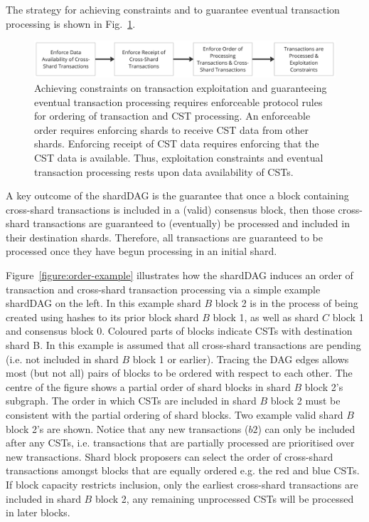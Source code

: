The strategy for achieving constraints and to guarantee eventual transaction processing is shown in Fig.~\ref{figure:shardDAGStrategy}. 
\begin{figure}[h!]
	\centering
	\includegraphics[width=1.0\textwidth]{figures/shardDAGStrategy.jpg}
	\caption{Achieving constraints on transaction exploitation and guaranteeing eventual transaction processing requires enforceable protocol rules for ordering of transaction and CST processing.
		An enforceable order requires enforcing shards to receive CST data from other shards. 
		Enforcing receipt of CST data requires enforcing that the CST data is available. 
		Thus, exploitation constraints and eventual transaction processing rests upon data availability of CSTs.}
	\label{figure:shardDAGStrategy}
\end{figure}

A key outcome of the shardDAG is the guarantee that once a block containing cross-shard transactions is included in a (valid) consensus block, then those cross-shard transactions are guaranteed to (eventually) be processed and included in their destination shards. 
Therefore, all transactions are guaranteed to be processed once they have begun processing in an initial shard.

Figure~\ref{figure:order-example} illustrates how the shardDAG induces an order of transaction and cross-shard transaction processing via a simple example shardDAG on the left. 
In this example shard $B$ block 2 is in the process of being created using hashes to its prior block shard $B$ block 1, as well as shard $C$ block 1 and consensus block 0. 
Coloured parts of blocks indicate CSTs with destination shard B.
In this example is assumed that all cross-shard transactions are pending (i.e. not included in shard $B$ block 1 or earlier). 
Tracing the DAG edges allows most (but not all) pairs of blocks to be ordered with respect to each other.
The centre of the figure shows a partial order of shard blocks in shard $B$ block 2’s subgraph.
The order in which CSTs are included in shard $B$ block 2 must be consistent with the partial ordering of shard blocks. 
Two example valid shard $B$ block 2's are shown.
Notice that any new transactions ($b2$) can only be included after any CSTs, i.e. transactions that are partially processed are prioritised over new transactions.
Shard block proposers can select the order of cross-shard transactions amongst blocks that are equally ordered e.g. the red and blue CSTs. 
If block capacity restricts inclusion, only the earliest cross-shard transactions are included in shard $B$ block 2, any remaining unprocessed CSTs will be processed in later blocks.

